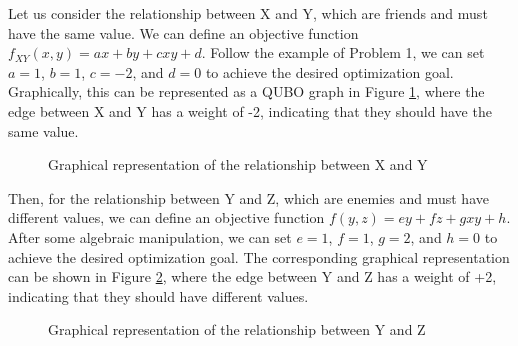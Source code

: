 Let us consider the relationship between X and Y, which are friends and must have the same value. We can define an objective function $f_{XY}(x, y) = ax+by+cxy+d$. Follow the example of Problem 1, we can set $a=1$, $b=1$, $c=-2$, and $d=0$ to achieve the desired optimization goal. Graphically, this can be represented as a QUBO graph in Figure \ref{fig:qubo_graph_4}, where the edge between X and Y has a weight of -2, indicating that they should have the same value. 
\begin{figure}
    \centering
    \caption{Graphical representation of the relationship between X and Y}\label{fig:qubo_graph_4}
\end{figure}

Then, for the relationship between Y and Z, which are enemies and must have different values, we can define an objective function $f(y,z) = ey+fz+gxy+h$. After some algebraic manipulation, we can set $e=1$, $f=1$, $g=2$, and $h=0$ to achieve the desired optimization goal. The corresponding graphical representation can be shown in Figure \ref{fig:qubo_graph_5}, where the edge between Y and Z has a weight of +2, indicating that they should have different values.
\begin{figure}
    \centering
    \caption{Graphical representation of the relationship between Y and Z}\label{fig:qubo_graph_5}
\end{figure}

